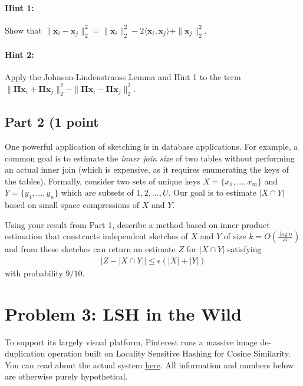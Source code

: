 \documentclass{article}
\begin{document}
\paragraph{Hint 1:} Show that $\| \mathbf{x}_i - \mathbf{x}_j \|_2^2 = \| \mathbf{x}_i \|_2^2 - 2 \langle \mathbf{x}_i, \mathbf{x}_j \rangle + \| \mathbf{x}_j \|_2^2$.

\paragraph{Hint 2:} Apply the Johnson-Lindenstrauss Lemma and Hint 1 to the term $\| \mathbf{\Pi x}_i + \mathbf{\Pi x}_j \|_2^2 - \| \mathbf{\Pi x}_i - \mathbf{\Pi x}_j \|_2^2$.

\subsection*{Part 2 (1 point}
One powerful application of sketching is in database applications. For example, a common goal is to estimate the \emph{inner join size} of two tables without performing an actual inner join (which is expensive, as it requires enumerating the keys of the tables).
Formally, consider two sets of unique keys $X = \{x_1, \ldots, x_m\}$ and $Y = \{y_1, \ldots, y_n\}$ which are subsets of $1,2, \ldots, U$. 
Our goal is to estimate $|X\cap Y|$ based on small space compressions of $X$ and $Y$.  

Using your result from Part 1, describe a method based on inner product estimation that constructs independent sketches of $X$ and $Y$ of size  $k = O\left(\frac{\log n}{\epsilon^2}\right)$ and from these sketches can return an estimate $Z$ for $|X\cap Y|$ satisfying
\begin{align*}
	\left|Z - |X\cap Y|\right| \leq \epsilon (|X|+|Y|)
\end{align*}
with probability $9/10$.

%

\newpage

\section*{Problem 3: LSH in the Wild}

To support its largely visual platform, Pinterest runs a massive image de-duplication operation built on Locality Sensitive Hashing for Cosine Similarity. You can read about the actual system \href{https://medium.com/pinterest-engineering/detecting-image-similarity-using-spark-lsh-and-tensorflow-618636afc939}{here}.
All information and numbers below are otherwise purely hypothetical.
\end{document}
